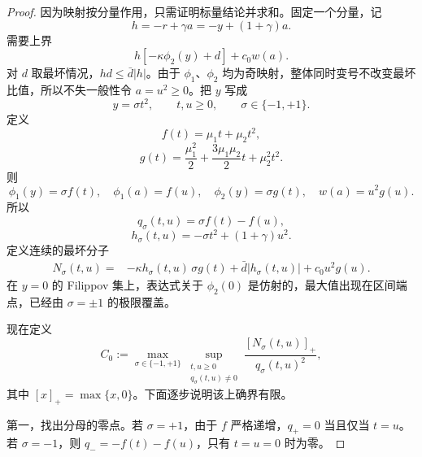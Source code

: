 \documentclass[UTF8,a4paper,12pt]{ctexart}
\newcommand{\abs}[1]{\left\lvert #1\right\rvert}
\begin{document}
\begin{proof}
因为映射按分量作用，只需证明标量结论并求和。固定一个分量，记
\begin{equation}
 h=-r+\gamma a=-y+(1+\gamma)a.
\end{equation}
需要上界
\begin{equation}
 h[-\kappa\phi_2(y)+d]+c_0w(a).
\end{equation}
对 $d$ 取最坏情况，$hd\le\bar d\abs h$。由于 $\phi_1$、$\phi_2$ 均为奇映射，整体同时变号不改变最坏比值，所以不失一般性令 $a=u^2\ge0$。把 $y$ 写成
\begin{equation}
 y=\sigma t^2,\qquad t,u\ge0,\qquad\sigma\in\{-1,+1\}.
\end{equation}
定义
\begin{equation}
 f(t)=\mu_1t+\mu_2t^2,
\end{equation}
\begin{equation}
 g(t)=\frac{\mu_1^2}{2}
 +\frac{3\mu_1\mu_2}{2}t+\mu_2^2t^2.
\end{equation}
则
\begin{equation}
 \phi_1(y)=\sigma f(t),\quad
 \phi_1(a)=f(u),\quad
 \phi_2(y)=\sigma g(t),\quad
 w(a)=u^2g(u).
\end{equation}
所以
\begin{equation}
 q_\sigma(t,u)=\sigma f(t)-f(u),
\end{equation}
\begin{equation}
 h_\sigma(t,u)=-\sigma t^2+(1+\gamma)u^2.
\end{equation}
定义连续的最坏分子
\begin{equation}
\begin{aligned}
 N_\sigma(t,u)
 ={}&-\kappa h_\sigma(t,u)\,\sigma g(t)
 +\bar d\abs{h_\sigma(t,u)}+c_0u^2g(u).
\end{aligned}
\label{eq:N-sigma}
\end{equation}
在 $y=0$ 的 Filippov 集上，表达式关于 $\phi_2(0)$ 是仿射的，最大值出现在区间端点，已经由 $\sigma=\pm1$ 的极限覆盖。

现在定义
\begin{equation}
 C_0:=\max_{\sigma\in\{-1,+1\}}
 \sup_{\substack{t,u\ge0\\q_\sigma(t,u)\ne0}}
 \frac{[N_\sigma(t,u)]_+}{q_\sigma(t,u)^2},
\label{eq:C0-def}
\end{equation}
其中 $[x]_+=\max\{x,0\}$。下面逐步说明该上确界有限。

第一，找出分母的零点。若 $\sigma=+1$，由于 $f$ 严格递增，$q_+=0$ 当且仅当 $t=u$。若 $\sigma=-1$，则
$q_-=-f(t)-f(u)$，只有 $t=u=0$ 时为零。


\end{proof}
\end{document}
